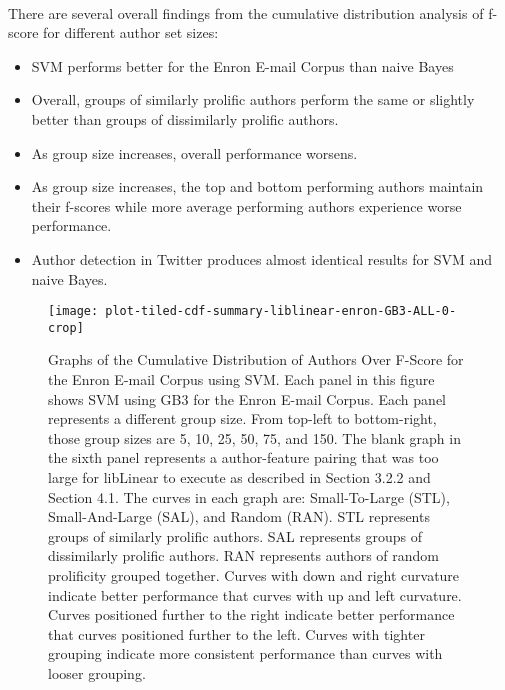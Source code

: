 	\paragraph*{} There are several overall findings from the cumulative distribution analysis of f-score for different author set sizes:
	\begin{itemize}
	\item SVM performs better for the Enron E-mail Corpus than naive Bayes
	\item Overall, groups of similarly prolific authors perform the same or slightly better than groups of dissimilarly prolific authors.
	\item As group size increases, overall performance worsens.
	\item As group size increases, the top and bottom performing authors maintain their f-scores while more average performing authors experience worse performance.
	\item Author detection in Twitter produces almost identical results for SVM and naive Bayes.
	\end{itemize}


	\begin{figure}[htbp!]
		\begin{center}
		\centering
		\texttt{[image: plot-tiled-cdf-summary-liblinear-enron-GB3-ALL-0-crop]}
		\caption{Graphs of the Cumulative Distribution of Authors Over F-Score for the Enron E-mail Corpus using SVM. Each panel in this figure shows SVM using GB3 for the Enron E-mail Corpus.  Each panel represents a different group size.  From top-left to bottom-right, those group sizes are 5, 10, 25, 50, 75, and 150.  The blank graph in the sixth panel represents a author-feature pairing that was too large for libLinear to execute as described in Section 3.2.2 and Section 4.1.  The curves in each graph are: Small-To-Large (STL), Small-And-Large (SAL), and Random (RAN).  STL represents groups of similarly prolific authors.  SAL represents groups of dissimilarly prolific authors.  RAN represents authors of random prolificity grouped together.  Curves with down and right curvature indicate better performance that curves with up and left curvature.  Curves positioned further to the right indicate better performance that curves positioned further to the left.  Curves with tighter grouping indicate more consistent performance than curves with looser grouping.}
		\label{fig:plot-tiled-cdf-summary-liblinear-enron-GB3-ALL-0}
		\end{center}
	\end{figure}


